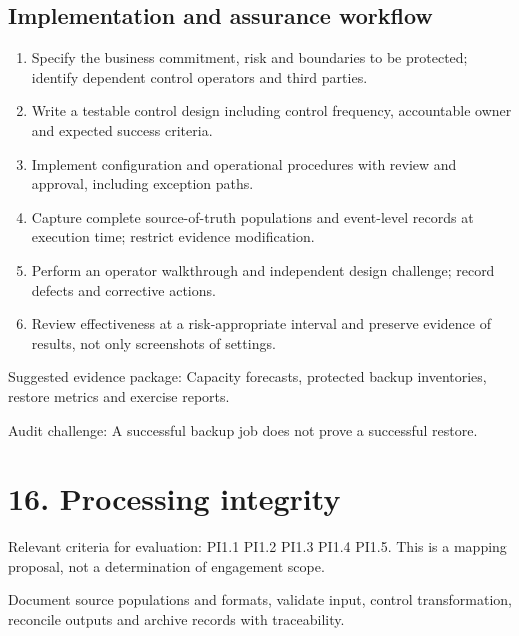 \documentclass[10pt,oneside]{report}
\begin{document}
\subsection{Implementation and assurance workflow}
\begin{enumerate}
\item Specify the business commitment, risk and boundaries to be protected; identify dependent control operators and third parties.
\item Write a testable control design including control frequency, accountable owner and expected success criteria.
\item Implement configuration and operational procedures with review and approval, including exception paths.
\item Capture complete source-of-truth populations and event-level records at execution time; restrict evidence modification.
\item Perform an operator walkthrough and independent design challenge; record defects and corrective actions.
\item Review effectiveness at a risk-appropriate interval and preserve evidence of results, not only screenshots of settings.
\end{enumerate}

Suggested evidence package: Capacity forecasts, protected backup inventories, restore metrics and exercise reports.

Audit challenge: A successful backup job does not prove a successful restore.

\section{16. Processing integrity}
Relevant criteria for evaluation: PI1.1 PI1.2 PI1.3 PI1.4 PI1.5. This is a mapping proposal, not a determination of engagement scope.

\begin{engineeringbox}
Document source populations and formats, validate input, control transformation, reconcile outputs and archive records with traceability.
\end{engineeringbox}
\end{document}
